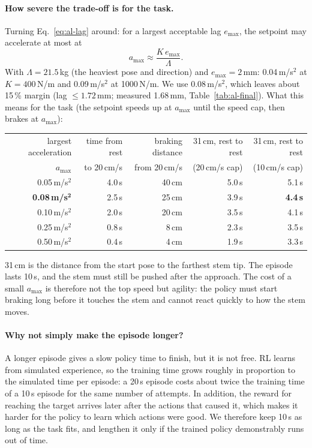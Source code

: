 \paragraph{How severe the trade-off is for the task.} Turning Eq.~\eqref{eq:al-lag} around: for a largest acceptable lag $e_\text{max}$, the
setpoint may accelerate at most at
\begin{equation}
  a_\text{max} \approx \frac{K\, e_\text{max}}{\Lambda}.
  \label{eq:al-amax}
\end{equation}
With $\Lambda = 21.5$\,kg (the heaviest pose and direction) and $e_\text{max} = 2$\,mm: 0.04\,m/s$^2$ at
$K = 400$\,N/m and 0.09\,m/s$^2$ at 1000\,N/m. We use 0.08\,m/s$^2$, which leaves about 15\,\% margin (lag
$\le 1.72$\,mm; measured 1.68\,mm, Table~\ref{tab:al-final}). What this means for the task (the
setpoint speeds up at $a_\text{max}$ until the speed cap, then brakes at $a_\text{max}$):
\begin{center}
{\renewcommand{\arraystretch}{1.15}
\begin{tabular}{rrrrr}
  \toprule
  largest acceleration & time from rest & braking distance & 31\,cm, rest to rest & 31\,cm, rest to rest \\
  $a_\text{max}$ & to 20\,cm/s & from 20\,cm/s & (20\,cm/s cap) & (10\,cm/s cap) \\
  \midrule
  0.05\,m/s$^2$ & 4.0\,s & 40\,cm & 5.0\,s & 5.1\,s \\
  \textbf{0.08\,m/s}$^\mathbf{2}$ & 2.5\,s & 25\,cm & 3.9\,s & \textbf{4.4\,s} \\
  0.10\,m/s$^2$ & 2.0\,s & 20\,cm & 3.5\,s & 4.1\,s \\
  0.25\,m/s$^2$ & 0.8\,s & 8\,cm  & 2.3\,s & 3.5\,s \\
  0.50\,m/s$^2$ & 0.4\,s & 4\,cm  & 1.9\,s & 3.3\,s \\
  \bottomrule
\end{tabular}}
\end{center}
31\,cm is the distance from the start pose to the farthest stem tip. The episode lasts 10\,s, and the stem must
still be pushed after the approach. The cost of a small $a_\text{max}$ is therefore not the top speed but agility:
the policy must start braking long before it touches the stem and cannot react quickly to how the stem moves.

\paragraph{Why not simply make the episode longer?} A longer episode gives a slow policy time to finish, but it is
not free. RL learns from simulated experience, so the training time grows roughly in proportion to the simulated
time per episode: a 20\,s episode costs about twice the training time of a 10\,s episode for the same number of
attempts. In addition, the reward for reaching the target arrives later after the actions that caused it, which
makes it harder for the policy to learn which actions were good. We therefore keep 10\,s as long as the task fits,
and lengthen it only if the trained policy demonstrably runs out of time.

